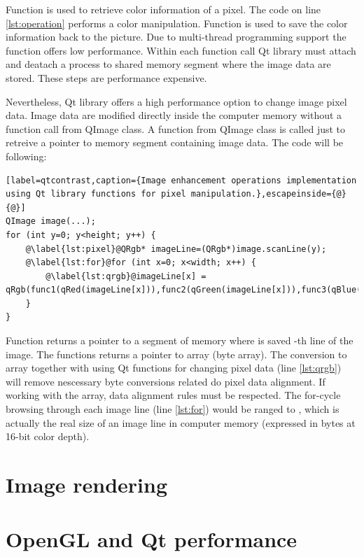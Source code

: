 Function  is used to retrieve color information of a pixel. The code on line \ref{lst:operation} performs a color manipulation. Function  is used to save the color information back to the picture. Due to multi-thread programming support the  function offers low performance. Within each function call Qt library must attach and deatach a process to shared memory segment where the image data are stored. These steps are performance expensive.

Nevertheless, Qt library offers a high performance option to change image pixel data. Image data are modified directly inside the computer memory without a function call from QImage class. A function from QImage class is called just to retreive a pointer to memory segment containing image data. The code will be following:

\begin{lstlisting}[label=qtcontrast,caption={Image enhancement operations implementation using Qt library functions for pixel manipulation.},escapeinside={@}{@}]
QImage image(...);
for (int y=0; y<height; y++) {
	@\label{lst:pixel}@QRgb* imageLine=(QRgb*)image.scanLine(y);
	@\label{lst:for}@for (int x=0; x<width; x++) {
		@\label{lst:qrgb}@imageLine[x] = qRgb(func1(qRed(imageLine[x])),func2(qGreen(imageLine[x])),func3(qBlue(imageLine[x])));
	}
}
\end{lstlisting}

Function  returns a pointer to a segment of memory where is saved -th line of the image. The  functions returns a pointer to  array (byte array). The conversion to  array together with using Qt functions for changing pixel data (line \ref{lst:qrgb}) will remove nescessary byte conversions related do pixel data alignment. If working with the  array, data alignment rules must be respected. The for-cycle browsing through each image line (line \ref{lst:for}) would be ranged to , which is actually the real size of an image line in computer memory (expressed in bytes at 16-bit color depth).


\section{Image rendering}




\section{OpenGL and Qt performance}


